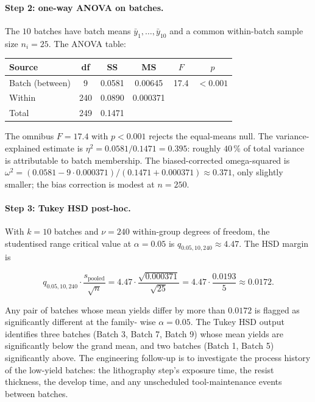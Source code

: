 \paragraph{Step 2: one-way ANOVA on batches.} The $10$ batches
have batch means $\bar{y}_{1}, \ldots, \bar{y}_{10}$ and a common
within-batch sample size $n_{i} = 25$. The ANOVA table:

\begin{center}
\begin{tabular}{lccccc}
\hline
Source & df & SS & MS & $F$ & $p$ \\
\hline
Batch (between) & 9 & 0.0581 & 0.00645 & 17.4 & $< 0.001$ \\
Within & 240 & 0.0890 & 0.000371 & & \\
Total & 249 & 0.1471 & & & \\
\hline
\end{tabular}
\end{center}

\noindent
The omnibus $F = 17.4$ with $p < 0.001$ rejects the equal-means
null. The variance-explained estimate is
$\eta^{2} = 0.0581/0.1471 = 0.395$: roughly $40 \,\%$ of total
variance is attributable to batch membership. The biased-corrected
omega-squared is
$\omega^{2} = (0.0581 - 9 \cdot 0.000371)/(0.1471 + 0.000371)
\approx 0.371$, only slightly smaller; the bias correction is
modest at $n = 250$.

\paragraph{Step 3: Tukey HSD post-hoc.} With $k = 10$ batches and
$\nu = 240$ within-group degrees of freedom, the studentised range
critical value at $\alpha = 0.05$ is $q_{0.05, 10, 240} \approx
4.47$. The HSD margin is

\[
q_{0.05, 10, 240} \cdot \frac{s_{\text{pooled}}}{\sqrt{n}}
= 4.47 \cdot \frac{\sqrt{0.000371}}{\sqrt{25}}
= 4.47 \cdot \frac{0.0193}{5}
\approx 0.0172.
\]

\noindent
Any pair of batches whose mean yields differ by more than
$0.0172$ is flagged as significantly different at the family-
wise $\alpha = 0.05$. The Tukey HSD output identifies three
batches (Batch 3, Batch 7, Batch 9) whose mean yields are
significantly below the grand mean, and two batches (Batch 1,
Batch 5) significantly above. The engineering follow-up is to
investigate the process history of the low-yield batches: the
lithography step's exposure time, the resist thickness, the
develop time, and any unscheduled tool-maintenance events
between batches.


